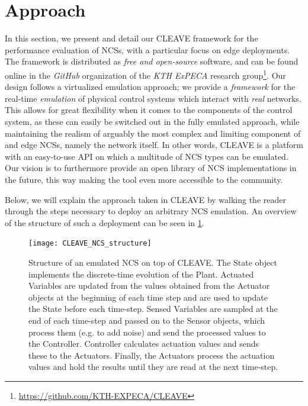 \section{Approach}\label{sec:approach}

In this section, we present and detail our \ac{CLEAVE} framework for the performance evaluation of \acfp{NCS}, with a particular focus on edge deployments.
The framework is distributed as \emph{free and open-source} software, and can be found online in the \emph{GitHub} organization of the \emph{KTH ExPECA} research group\footnote{\url{https://github.com/KTH-EXPECA/CLEAVE}}.
Our design follows a virtualized emulation approach; we provide a \emph{framework} for the real-time \emph{emulation} of physical control systems which interact with \emph{real} networks.
This allows for great flexibility when it comes to the components of the control system, as these can easily be switched out in the fully emulated approach, while maintaining the realism of arguably the most complex and limiting component of and edge \acp{NCS}, namely the network itself.
In other words, \ac{CLEAVE} is a platform with an easy-to-use \ac{API} on which a multitude of \ac{NCS} types can be emulated.
Our vision is to furthermore provide an open library of \ac{NCS} implementations in the future, this way making the tool even more accessible to the community.

Below, we will explain the approach taken in \ac{CLEAVE} by walking the reader through the steps necessary to deploy an arbitrary \ac{NCS} emulation.
An overview of the structure of such a deployment can be seen in \cref{fig:cleave:ncs:struct}.

\begin{figure}
    \centering
    \texttt{[image: CLEAVE\_NCS\_structure]}
    \caption{
        Structure of an emulated \ac{NCS} on top of CLEAVE.\@
        The State object implements the discrete-time evolution of the Plant.
        Actuated Variables are updated from the values obtained from the Actuator objects at the beginning of each time step and are used to update the State before each time-step.
        Sensed Variables are sampled at the end of each time-step and passed on to the Sensor objects, which process them (e.g. to add noise) and send the processed values to the Controller.
        Controller calculates actuation values and sends these to the Actuators.
        Finally, the Actuators process the actuation values and hold the results until they are read at the next time-step.
    }\label{fig:cleave:ncs:struct}
\end{figure}

